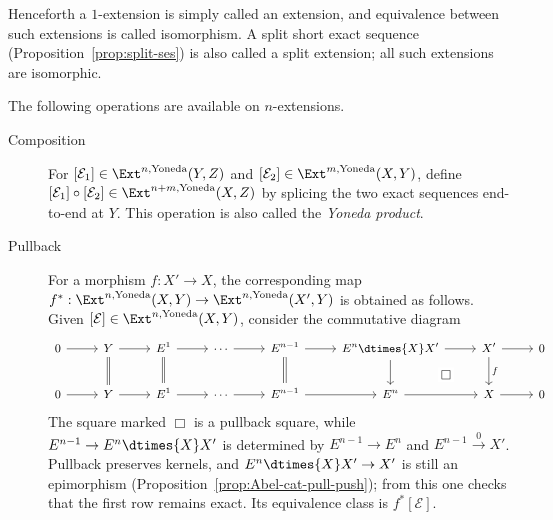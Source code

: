 \begin{convention}
	Henceforth a $1$-extension is simply called an extension, and equivalence
	between such extensions is called isomorphism. A split short exact
	sequence (Proposition~\ref{prop:split-ses}) is also called a split
	extension; all such extensions are isomorphic.
\end{convention}

The following operations are available on $n$-extensions.

\begin{description}
	\item[Composition] For
	$[\mathcal{E}_1]\in\Ext^{n,\text{Yoneda}}(Y,Z)$ and
	$[\mathcal{E}_2]\in\Ext^{m,\text{Yoneda}}(X,Y)$, define
	$[\mathcal{E}_1]\circ[\mathcal{E}_2]\in
	\Ext^{n+m,\text{Yoneda}}(X,Z)$ by splicing the two exact sequences
	end-to-end at $Y$. This operation is also called the \emph{Yoneda
	product}.
	\item[Pullback] For a morphism $f:X'\to X$, the corresponding map
	$f^*:\Ext^{n,\text{Yoneda}}(X,Y)\to
	\Ext^{n,\text{Yoneda}}(X',Y)$ is obtained as follows. Given
	$[\mathcal{E}]\in\Ext^{n,\text{Yoneda}}(X,Y)$, consider the commutative
	diagram
	\[\begin{tikzcd}[every cell/.append style={font=\small}]
		0 \arrow[r] & Y \arrow[r] \arrow[equal, d] & E^1 \arrow[r] \arrow[equal, d] & \cdots \arrow[r] & E^{n-1}  \arrow[equal, d] \arrow[r] & E^n \dtimes{X} X' \arrow[d] \arrow[r] \arrow[phantom, rd, "\Box" description] & X' \arrow[d, "f"] \arrow[r] & 0 \\
		0 \arrow[r] & Y \arrow[r] & E^1 \arrow[r] & \cdots \arrow[r] & E^{n-1} \arrow[r] & E^n \arrow[r] & X \arrow[r] & 0
	\end{tikzcd}\]
	The square marked $\Box$ is a pullback square, while
	$E^{n-1}\to E^n\dtimes{X}X'$ is determined by $E^{n-1}\to E^n$ and
	$E^{n-1}\xrightarrow{0}X'$. Pullback preserves kernels, and
	$E^n\dtimes{X}X'\to X'$ is still an epimorphism
	(Proposition~\ref{prop:Abel-cat-pull-push}); from this one checks that the
	first row remains exact. Its equivalence class is $f^*[\mathcal{E}]$.


\end{description}
